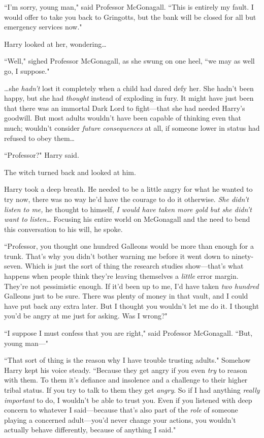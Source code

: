 ``I'm sorry, young man," said Professor McGonagall. ``This is entirely my fault. I would offer to take you back to Gringotts, but the bank will be closed for all but emergency services now."

Harry looked at her, wondering…

``Well," sighed Professor McGonagall, as she swung on one heel, ``we may as well go, I suppose."

…she \emph{hadn't} lost it completely when a child had dared defy her. She hadn't been happy, but she had \emph{thought} instead of exploding in fury. It might have just been that there was an immortal Dark Lord to fight—that she had needed Harry's goodwill. But most adults wouldn't have been capable of thinking even that much; wouldn't consider \emph{future consequences} at all, if someone lower in status had refused to obey them…

``Professor?" Harry said.

The witch turned back and looked at him.

Harry took a deep breath. He needed to be a little angry for what he wanted to try now, there was no way he'd have the courage to do it otherwise. \emph{She didn't listen to me,} he thought to himself, \emph{I would have taken more gold but she didn't want to listen…} Focusing his entire world on McGonagall and the need to bend this conversation to his will, he spoke.

``Professor, you thought one hundred Galleons would be more than enough for a trunk. That's why you didn't bother warning me before it went down to ninety-seven. Which is just the sort of thing the research studies show—that's what happens when people think they're leaving themselves a \emph{little} error margin. They're not pessimistic enough. If it'd been up to me, I'd have taken \emph{two hundred} Galleons just to be sure. There was plenty of money in that vault, and I could have put back any extra later. But I thought you wouldn't let me do it. I thought you'd be angry at me just for asking. Was I wrong?"

``I suppose I must confess that you are right," said Professor McGonagall. ``But, young man—"

``That sort of thing is the reason why I have trouble trusting adults." Somehow Harry kept his voice steady. ``Because they get angry if you even \emph{try} to reason with them. To them it's defiance and insolence and a challenge to their higher tribal status. If you try to talk to them they get \emph{angry}. So if I had anything \emph{really important} to do, I wouldn't be able to trust you. Even if you listened with deep concern to whatever I said—because that's also part of the \emph{role} of someone playing a concerned adult—you'd never change your actions, you wouldn't actually behave differently, because of anything I said."

